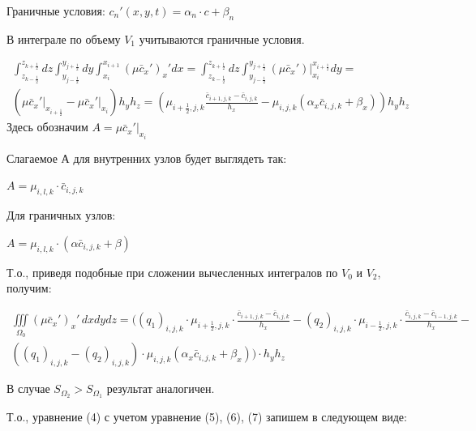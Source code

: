 \documentclass[12pt]{article}
\begin{document}
Граничные условия:
$c_n'(x,y,t)=\alpha_n\cdot c+\beta_n$

В интеграле по объему $V_1$ учитываются граничные условия.

\begin{multline*} 
    \int_{z_{k-\frac{1}{2}}}^{z_{k+\frac{1}{2}}}dz    
	\int_{y_{j-\frac{1}{2}}}^{y_{j+\frac{1}{2}}}dy  
	\int_{x_{i}}^{x_{i+1}}(\mu\bar{c}_x')_x'dx = 
	\int_{z_{k-\frac{1}{2}}}^{z_{k+\frac{1}{2}}}dz    
	\int_{y_{j-\frac{1}{2}}}^{y_{j+\frac{1}{2}}}(\mu\bar{c}_x')
	\bigg|_{x_{i}}^{x_{i+\frac{1}{2}}}dy = 	\\
	\left(\mu\bar{c}_x'\bigg|_{x_{i+\frac{1}{2}}} - \mu\bar{c}_x'\bigg|_{x_i}    	\right)h_yh_z = \left(\mu_{i+\frac{1}{2},j,k} \frac{\bar{c}_{i+1,j,k}- \bar{c}_{i,j,k}}{h_x} - \mu_{i,j,k}(\alpha_x\bar{c}_{i,j,k} + \beta_x)  \right)h_yh_z
\end{multline*} 
Здесь  обозначим $A=\mu\bar{c}_x'\bigg|_{x_i}  $

Слагаемое А для внутренних узлов будет выглядеть так: 

 $A=\mu_{i,l,k}\cdot\bar{c}_{i,j,k}$

Для граничных узлов:

 $A=\mu_{i,l,k}\cdot( \alpha\bar{c}_{i,j,k}+\beta)$


Т.о., приведя подобные при сложении вычесленных интегралов по $V_0$ и $V_2$, получим:

\begin{multline} 
	\iiint\limits_{\Omega_0} (\mu\bar{c}_x')_x'\,dxdydz =    ((q_1)_{i,j,k}\cdot\mu_{i+\frac{1}{2},j,k}\cdot\frac{\bar{c}_{i+1,j,k}-\bar{c}_{i,j,k}}{h_x} - (q_2)_{i,j,k}\cdot\mu_{i-\frac{1}{2},j,k}\cdot\frac{\bar{c}_{i,j,k}-\bar{c}_{i-1,j,k}}{h_x} -     \\
	((q_1)_{i,j,k}-(q_2)_{i,j,k})\cdot\mu_{i,j,k}(\alpha_x\bar{c}_{i,j,k} + 
	\beta_x) )\cdot h_yh_z   
\end{multline} 

В случае $S_{\Omega_2}>S_{\Omega_1}$ результат аналогичен.

Т.о., уравнение  (4) с учетом уравнение (5), (6), (7) запишем в следующем виде:
\end{document}

